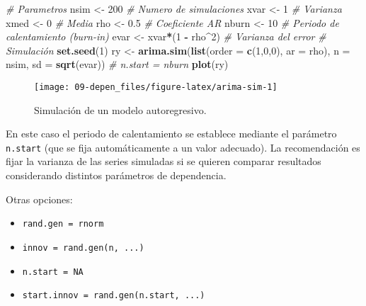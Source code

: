 \documentclass[]{book}
\newenvironment{Shaded}{\begin{snugshade}}{\end{snugshade}}
\newcommand{\KeywordTok}[1]{\textcolor[rgb]{0.13,0.29,0.53}{\textbf{#1}}}
\newcommand{\DataTypeTok}[1]{\textcolor[rgb]{0.13,0.29,0.53}{#1}}
\newcommand{\DecValTok}[1]{\textcolor[rgb]{0.00,0.00,0.81}{#1}}
\newcommand{\FloatTok}[1]{\textcolor[rgb]{0.00,0.00,0.81}{#1}}
\newcommand{\StringTok}[1]{\textcolor[rgb]{0.31,0.60,0.02}{#1}}
\newcommand{\CommentTok}[1]{\textcolor[rgb]{0.56,0.35,0.01}{\textit{#1}}}
\newcommand{\OperatorTok}[1]{\textcolor[rgb]{0.81,0.36,0.00}{\textbf{#1}}}
\newcommand{\NormalTok}[1]{#1}
\theoremstyle{break}
\theoremstyle{definition}
\theoremstyle{definition}
\theoremstyle{definition}
\theoremstyle{remark}
\begin{document}
\begin{Shaded}
\begin{Highlighting}[]
\CommentTok{# Parametros}
\NormalTok{nsim <-}\StringTok{ }\DecValTok{200}   \CommentTok{# Numero de simulaciones}
\NormalTok{xvar <-}\StringTok{ }\DecValTok{1}     \CommentTok{# Varianza}
\NormalTok{xmed <-}\StringTok{ }\DecValTok{0}     \CommentTok{# Media}
\NormalTok{rho <-}\StringTok{ }\FloatTok{0.5}    \CommentTok{# Coeficiente AR}
\NormalTok{nburn <-}\StringTok{ }\DecValTok{10}   \CommentTok{# Periodo de calentamiento (burn-in)}
\NormalTok{evar <-}\StringTok{ }\NormalTok{xvar}\OperatorTok{*}\NormalTok{(}\DecValTok{1} \OperatorTok{-}\StringTok{ }\NormalTok{rho}\OperatorTok{^}\DecValTok{2}\NormalTok{) }\CommentTok{# Varianza del error}
\CommentTok{# Simulación}
\KeywordTok{set.seed}\NormalTok{(}\DecValTok{1}\NormalTok{)}
\NormalTok{ry <-}\StringTok{ }\KeywordTok{arima.sim}\NormalTok{(}\KeywordTok{list}\NormalTok{(}\DataTypeTok{order =} \KeywordTok{c}\NormalTok{(}\DecValTok{1}\NormalTok{,}\DecValTok{0}\NormalTok{,}\DecValTok{0}\NormalTok{), }\DataTypeTok{ar =}\NormalTok{ rho), }
            \DataTypeTok{n =}\NormalTok{ nsim, }\DataTypeTok{sd =} \KeywordTok{sqrt}\NormalTok{(evar)) }\CommentTok{# n.start = nburn}
\KeywordTok{plot}\NormalTok{(ry)}
\end{Highlighting}
\end{Shaded}

\begin{figure}[!htb]

{\centering \texttt{[image: 09-depen\_files/figure-latex/arima-sim-1]} 

}

\caption{Simulación de un modelo autoregresivo.}\label{fig:arima-sim}
\end{figure}

En este caso el periodo de calentamiento se establece mediante el
parámetro \texttt{n.start} (que se fija automáticamente a un valor
adecuado). La recomendación es fijar la varianza de las series simuladas
si se quieren comparar resultados considerando distintos parámetros de
dependencia.

Otras opciones:

\begin{itemize}
\item
  \texttt{rand.gen\ =\ rnorm}
\item
  \texttt{innov\ =\ rand.gen(n,\ ...)}
\item
  \texttt{n.start\ =\ NA}
\item
  \texttt{start.innov\ =\ rand.gen(n.start,\ ...)}
\end{itemize}
\end{document}
